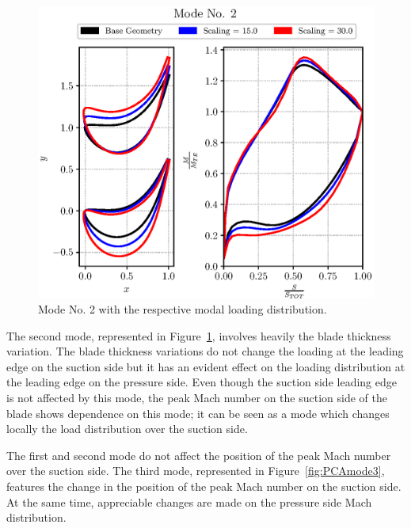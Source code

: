 \begin{figure}[H]
    \centering
    \includegraphics[scale=\scaleBlade]{./images/mode02.eps}
    \caption{Mode No. 2 with the respective modal loading distribution.}
    \label{fig:PCAmode2}
\end{figure}

The second mode, represented in Figure~\ref{fig:PCAmode2}, involves heavily the blade thickness variation.
The blade thickness variations do not change the loading at the leading edge on the suction side 
but it has an evident effect on the loading distribution at the leading edge on the pressure side. 
Even though the suction side leading edge is not affected by this mode, the peak Mach number 
on the suction side of the blade shows dependence on this mode; it can be seen as a mode 
which changes locally the load distribution over the suction side.

The first and second mode do not affect the position of the peak Mach number over the suction side.
The third mode, represented in Figure~\ref{fig:PCAmode3}, features the change in the position of the peak Mach number on the suction side. 
At the same time, appreciable changes are made on the pressure side Mach distribution.

